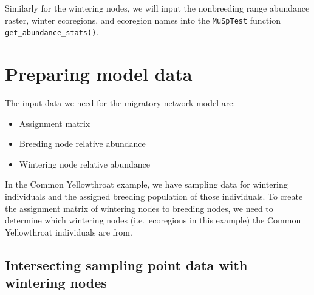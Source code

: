 \documentclass[
]{book}
\newenvironment{Shaded}{\begin{snugshade}}{\end{snugshade}}
\newcommand{\AttributeTok}[1]{\textcolor[rgb]{0.77,0.63,0.00}{#1}}
\newcommand{\DocumentationTok}[1]{\textcolor[rgb]{0.56,0.35,0.01}{\textbf{\textit{#1}}}}
\newcommand{\FunctionTok}[1]{\textcolor[rgb]{0.00,0.00,0.00}{#1}}
\newcommand{\NormalTok}[1]{#1}
\newcommand{\OtherTok}[1]{\textcolor[rgb]{0.56,0.35,0.01}{#1}}
\newcommand{\SpecialCharTok}[1]{\textcolor[rgb]{0.00,0.00,0.00}{#1}}
\newcommand{\StringTok}[1]{\textcolor[rgb]{0.31,0.60,0.02}{#1}}
\providecommand{\tightlist}{%
  \setlength{\itemsep}{0pt}\setlength{\parskip}{0pt}}
\begin{document}
Similarly for the wintering nodes, we will input the nonbreeding range abundance raster, winter ecoregions, and ecoregion names into the \texttt{MuSpTest} function \texttt{get\_abundance\_stats()}.

\begin{Shaded}
\end{Shaded}

\hypertarget{preparing-model-data}{%
\section{Preparing model data}\label{preparing-model-data}}

The input data we need for the migratory network model are:

\begin{itemize}
\tightlist
\item
  Assignment matrix
\item
  Breeding node relative abundance
\item
  Wintering node relative abundance
\end{itemize}

In the Common Yellowthroat example, we have sampling data for wintering individuals and the assigned breeding population of those individuals. To create the assignment matrix of wintering nodes to breeding nodes, we need to determine which wintering nodes (i.e.~ecoregions in this example) the Common Yellowthroat individuals are from.

\hypertarget{intersecting-sampling-point-data-with-wintering-nodes}{%
\subsection{Intersecting sampling point data with wintering nodes}\label{intersecting-sampling-point-data-with-wintering-nodes}}
\end{document}
